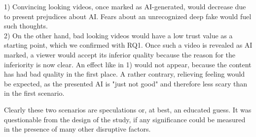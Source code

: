 \documentclass[
  a4paper,  %
  twoside,  %
  bibliography=totoc,
  headsepline,
  cleardoublepage=empty,
  parskip=half,
  draft=false
]{scrbook}
\begin{document}
1) Convincing looking videos, once marked as AI-generated, would decrease due to present prejudices about AI. Fears about an unrecognized deep fake would fuel such thoughts. \\
2) On the other hand, bad looking videos would have a low trust value as a starting point, which we confirmed with RQ1. Once such a video is revealed as AI marked, a viewer would accept its inferior quality because the reason for the inferiority is now clear. An effect like in 1) would not appear, because the content has had bad quality in the first place. A rather contrary, relieving feeling would be expected, as the presented AI is "just not good" and therefore less scary than in the first scenario.

Clearly these two scenarios are speculations or, at best, an educated guess. It was questionable from the design of the study, if any significance could be measured in the presence of many other disruptive factors.
\end{document}
